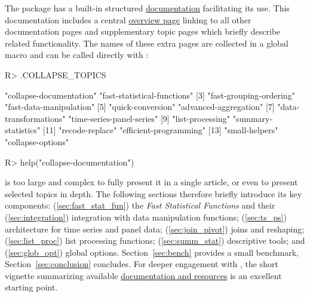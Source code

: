 \documentclass[article]{jss}
\begin{document}
The package has a built-in structured \href{https://sebkrantz.github.io/collapse/reference/collapse-documentation.html}{documentation} facilitating its use. This documentation includes a central \href{https://sebkrantz.github.io/collapse/reference/collapse-documentation.html}{overview page} linking to all other documentation pages and supplementary topic pages which briefly describe related functionality. The names of these extra pages are collected in a global macro  and can be called directly with :
%
\begin{Schunk}
\begin{Sinput}
R> .COLLAPSE_TOPICS
\end{Sinput}
\begin{Soutput}
 [1] "collapse-documentation"     "fast-statistical-functions"
 [3] "fast-grouping-ordering"     "fast-data-manipulation"    
 [5] "quick-conversion"           "advanced-aggregation"      
 [7] "data-transformations"       "time-series-panel-series"  
 [9] "list-processing"            "summary-statistics"        
[11] "recode-replace"             "efficient-programming"     
[13] "small-helpers"              "collapse-options"          
\end{Soutput}
\begin{Sinput}
R> help("collapse-documentation")
\end{Sinput}
\end{Schunk}
%
 is too large and complex to fully present it in a single article, or even to present selected topics in depth. The following sections therefore briefly introduce its key components: (\ref{sec:fast_stat_fun}) the \emph{Fast Statistical Functions} and their (\ref{sec:integration}) integration with data manipulation functions; (\ref{sec:ts_ps}) architecture for time series and panel data; (\ref{sec:join_pivot}) joins and reshaping; (\ref{sec:list_proc}) list processing functions; (\ref{sec:summ_stat}) descriptive tools; and (\ref{sec:glob_opt}) global options. Section~\ref{sec:bench} provides a small benchmark, Section~\ref{sec:conclusion} concludes. For deeper engagement with , the short vignette summarizing available \href{https://sebkrantz.github.io/collapse/articles/collapse_documentation.html}{documentation and resources} is an excellent starting point.
%
\end{document}

